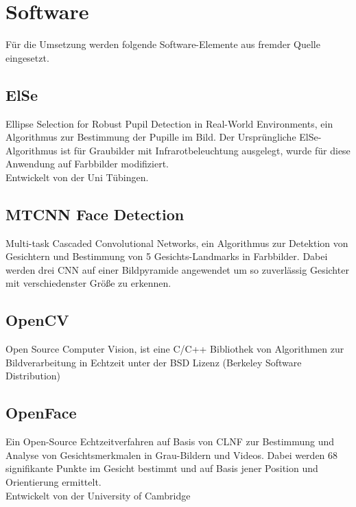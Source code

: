 \section{Software}
Für die Umsetzung werden folgende Software-Elemente aus fremder Quelle eingesetzt.
\subsection{ElSe}
Ellipse Selection for Robust Pupil Detection in Real-World Environments, ein Algorithmus zur Bestimmung der Pupille im Bild. Der Ursprüngliche ElSe-Algorithmus ist für Graubilder mit Infrarotbeleuchtung ausgelegt, wurde für diese Anwendung auf Farbbilder modifiziert.\\
Entwickelt von der Uni Tübingen. \cite{ElSe}
\subsection{MTCNN Face Detection}
Multi-task Cascaded Convolutional Networks, ein Algorithmus zur Detektion von Gesichtern und Bestimmung von 5 Gesichts-Landmarks in Farbbilder. Dabei werden drei CNN auf einer Bildpyramide angewendet um so zuverlässig Gesichter mit verschiedenster Größe zu erkennen.\\
\cite{MTCCN}
\subsection{OpenCV}
Open Source Computer Vision, ist eine C/C++ Bibliothek von Algorithmen zur Bildverarbeitung in Echtzeit unter der BSD Lizenz (Berkeley
Software Distribution)\\
\cite{wiki_Wha_is_OPenCV}\cite{OpenCv_What_Is}
\subsection{OpenFace}
Ein Open-Source Echtzeitverfahren auf Basis von CLNF zur Bestimmung und Analyse von Gesichtsmerkmalen in Grau-Bildern und Videos. Dabei werden 68 signifikante Punkte im Gesicht bestimmt und auf Basis jener Position und Orientierung ermittelt.\\
Entwickelt von der University of Cambridge \cite{OpenFace}
